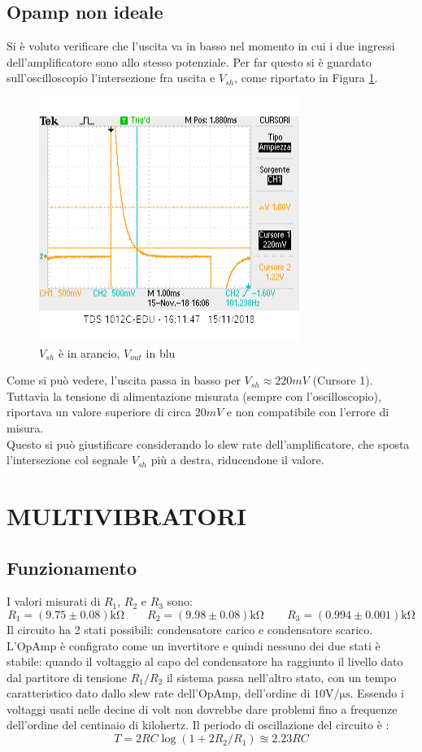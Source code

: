 \documentclass[10pt,a4paper]{article}
\begin{document}
\subsection{Opamp non ideale}
	Si è voluto verificare che l'uscita va in basso nel momento in cui i due ingressi dell'amplificatore sono allo stesso potenziale. Per far questo si è guardato sull'oscilloscopio l'intersezione fra uscita e $V_{sh}$, come riportato in Figura \ref{220mv}.
\begin{figure} \centering
	\includegraphics[scale=0.7]{220mv_1.png}
		\caption{$V_{sh}$ è in arancio, $V_{out}$ in blu}
	\label{220mv}

\end{figure}
Come si può vedere, l'uscita passa in basso per $V_{sh}\approx220mV$ (Cursore 1). Tuttavia la tensione di alimentazione misurata (sempre con l'oscilloscopio), riportava un valore superiore di circa $20mV$ e non compatibile con l'errore di misura.\\ Questo si può giustificare considerando lo slew rate dell'amplificatore, che sposta l'intersezione col segnale $V_{sh} $ più a destra, riducendone il valore.

\section{ MULTIVIBRATORI }


\subsection{Funzionamento}
I valori misurati di $R_1$, $R_2$ e $R_3$ sono:
\[ R_1 = (9.75\pm 0.08)\si{\kilo\ohm} \qquad  R_2 = (9.98 \pm 0.08)\si{\kilo\ohm} \qquad   R_3 = ( 0.994 \pm0.001 ) \si{\kilo\ohm}\]
  Il circuito ha 2 stati possibili: condensatore carico e condensatore scarico. L'OpAmp è configrato come un invertitore e quindi nessuno dei due stati è stabile: quando il voltaggio al capo del condensatore ha raggiunto il livello dato dal partitore di tensione $R_1/R_2$ il sistema passa nell'altro stato, con un tempo caratteristico dato dallo slew rate dell'OpAmp, dell'ordine di $10 \si{\volt\per\micro\second}$. Essendo i voltaggi usati nelle decine di volt non dovrebbe dare problemi fino a frequenze dell'ordine del centinaio di kilohertz.\label{slew_rate_count}
Il periodo di oscillazione del circuito è : \[ T = 2 RC \log( 1+ 2 R_2/R_1) \approxeq 2.23 RC\]
\end{document}
